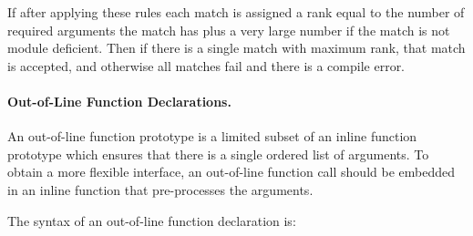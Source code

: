 \documentclass[12pt]{article}
\newcommand{\subsubsubsection}[1]{\paragraph[#1]{#1.}}
\begin{document}
If after applying these rules each match is assigned a rank
equal to the number of required arguments the match has
plus a very large number if the match is not module deficient.
Then if there is a single match with maximum rank, that match
is accepted, and otherwise all matches fail and there is
a compile error.

\subsubsubsection{Out-of-Line Function Declarations}
\label{OUT-OF-LINE-FUNCTION-DECLARATIONS}

An out-of-line function prototype is a limited subset of
an inline function prototype which ensures that there is
a single ordered list of arguments.  To obtain a more
flexible interface, an out-of-line function call should
be embedded in an inline function that pre-processes the
arguments.

The syntax of an out-of-line function declaration is:
\end{document}
